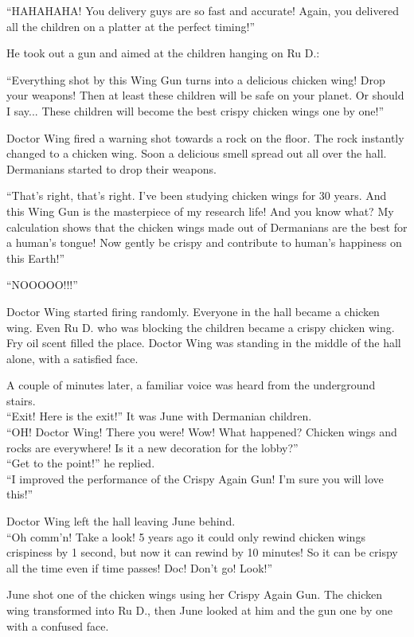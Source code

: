 ``HAHAHAHA! You delivery guys are so fast and accurate! Again, you delivered all the children on a platter at the perfect timing!''

He took out a gun and aimed at the children hanging on Ru D.:

``Everything shot by this Wing Gun turns into a delicious chicken wing! Drop your weapons! Then at least these children will be safe on your planet. Or should I say... These children will become the best crispy chicken wings one by one!'' 

Doctor Wing fired a warning shot towards a rock on the floor. The rock instantly changed to a chicken wing. Soon a delicious smell spread out all over the hall. Dermanians started to drop their weapons. 

``That's right, that's right. I've been studying chicken wings for 30 years. And this Wing Gun is the masterpiece of my research life! And you know what? My calculation shows that the chicken wings made out of Dermanians are the best for a human's tongue! Now gently be crispy and contribute to human's happiness on this Earth!''

``NOOOOO!!!''

Doctor Wing started firing randomly. Everyone in the hall became a chicken wing. Even Ru D. who was blocking the children became a crispy chicken wing. Fry oil scent filled the place. Doctor Wing was standing in the middle of the hall alone, with a satisfied face.

A couple of minutes later, a familiar voice was heard from the underground stairs. \\
``Exit! Here is the exit!'' It was June with Dermanian children. \\
``OH! Doctor Wing! There you were! Wow! What happened? Chicken wings and rocks are everywhere! Is it a new decoration for the lobby?'' \\
``Get to the point!'' he replied. \\
``I improved the performance of the Crispy Again Gun! I'm sure you will love this!''  

Doctor Wing left the hall leaving June behind. \\
``Oh comm'n! Take a look! 5 years ago it could only rewind chicken wings crispiness by 1 second, but now it can rewind by 10 minutes! So it can be crispy all the time even if time passes! Doc! Don't go! Look!''

June shot one of the chicken wings using her Crispy Again Gun. The chicken wing transformed into Ru D., then June looked at him and the gun one by one with a confused face.

